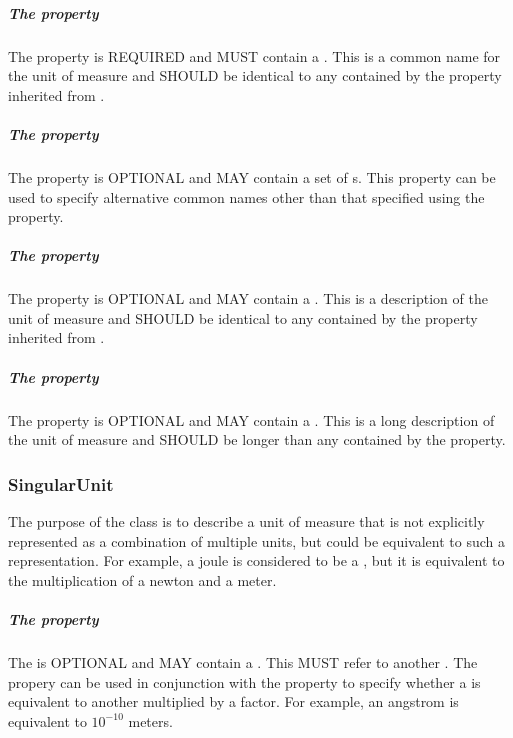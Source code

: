 \subparagraph{The  property}\label{sec:label:Unit}
The  property is REQUIRED and MUST contain a . This  is a common name for the unit of measure and SHOULD be identical to any  contained by the  property inherited from .

\subparagraph{The  property}\label{sec:alternativeLabels:Unit}
The  property is OPTIONAL and MAY contain a set of s. This property can be used to specify alternative common names other than that specified using the  property.

\subparagraph{The  property}\label{sec:comment:Unit}
The  property is OPTIONAL and MAY contain a . This  is a description of the unit of measure and SHOULD be identical to any  contained by the  property inherited from .

\subparagraph{The  property}\label{sec:longcomment:Unit}
The  property is OPTIONAL and MAY contain a . This  is a long description of the unit of measure and SHOULD be longer than any  contained by the  property.

\subsubsection{SingularUnit}
\label{sec:SingularUnit}

The purpose of the  class is to describe a unit of measure that is not explicitly represented as a combination of multiple units, but could be equivalent to such a representation. For example, a joule is considered to be a , but it is equivalent to the multiplication of a newton and a meter.  

\subparagraph{The  property}\label{sec:hasUnit:SingularUnit}
The  is OPTIONAL and MAY contain a . This  MUST refer to another . The  propery can be used in conjunction with the  property to specify whether a  is equivalent to another  multiplied by a factor. For example, an angstrom is equivalent to $10^{-10}$ meters.

